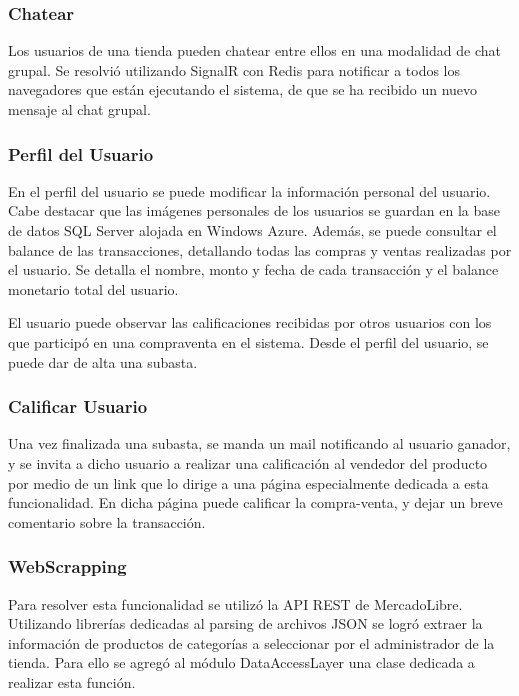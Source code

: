 \documentclass[journal]{IEEEtran}
\begin{document}
\subsubsection{Chatear}
Los usuarios de una tienda pueden chatear entre ellos en una modalidad de chat grupal. Se resolvió utilizando SignalR con Redis para notificar a todos los navegadores que están ejecutando el sistema, de que se ha recibido un nuevo mensaje al chat grupal.

\subsubsection{Perfil del Usuario}
En el perfil del usuario se puede modificar la información personal del usuario. Cabe destacar que las imágenes personales de los usuarios se guardan en la base de datos SQL Server alojada en Windows Azure.
Además, se puede consultar el balance de las transacciones, detallando todas las compras y ventas realizadas por el usuario. Se detalla el nombre, monto y fecha de cada transacción y el balance monetario total del usuario.

El usuario puede observar las calificaciones recibidas por otros usuarios con los que participó en una compraventa en el sistema. Desde el perfil del usuario, se puede dar de alta una subasta.

\subsubsection{Calificar Usuario}
Una vez finalizada una subasta, se manda un mail notificando al usuario ganador, y se invita a dicho usuario a realizar una calificación al vendedor del producto por medio de un link que lo dirige a una página especialmente dedicada a esta funcionalidad.
En dicha página puede calificar la compra-venta, y dejar un breve comentario sobre la transacción.

\subsubsection{WebScrapping} 
\label{sec:webscrap}
Para resolver esta funcionalidad se utilizó la API REST de MercadoLibre. Utilizando librerías dedicadas al parsing de archivos JSON se logró extraer la información de productos de categorías a seleccionar por el administrador de la tienda. Para ello se agregó al módulo DataAccessLayer una clase dedicada a realizar esta función.
\end{document}
